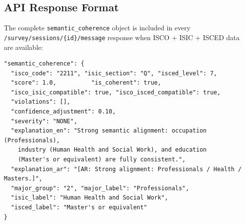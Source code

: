 \begin{table}[htbp]
\centering
\caption{SRE violation severity, confidence adjustment, and HITL routing.}
\label{tab:ch3-sre}
\small\renewcommand{\arraystretch}{1.35}
\end{table}

\subsection{API Response Format}

The complete \texttt{semantic\_coherence} object is included in every
\texttt{/survey/sessions/\allowbreak\{id\}/\allowbreak message} response when ISCO + ISIC + ISCED
data are available:

\begin{lstlisting}
"semantic_coherence": {
  "isco_code": "2211", "isic_section": "Q", "isced_level": 7,
  "score": 1.0,          "is_coherent": true,
  "isco_isic_compatible": true, "isco_isced_compatible": true,
  "violations": [],
  "confidence_adjustment": 0.10,
  "severity": "NONE",
  "explanation_en": "Strong semantic alignment: occupation (Professionals),
    industry (Human Health and Social Work), and education
    (Master's or equivalent) are fully consistent.",
  "explanation_ar": "[AR: Strong alignment: Professionals / Health / Masters.]",
  "major_group": "2", "major_label": "Professionals",
  "isic_label": "Human Health and Social Work",
  "isced_label": "Master's or equivalent"
}
\end{lstlisting}

